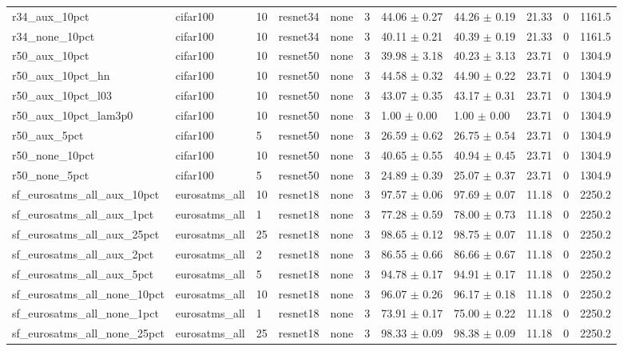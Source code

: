 \begin{tabular}{lllllllllll}
r34_aux_10pct & cifar100 & 10 & resnet34 & none & 3 & 44.06 $\pm$ 0.27 & 44.26 $\pm$ 0.19 & 21.33 & 0 & 1161.5 \\
r34_none_10pct & cifar100 & 10 & resnet34 & none & 3 & 40.11 $\pm$ 0.21 & 40.39 $\pm$ 0.19 & 21.33 & 0 & 1161.5 \\
r50_aux_10pct & cifar100 & 10 & resnet50 & none & 3 & 39.98 $\pm$ 3.18 & 40.23 $\pm$ 3.13 & 23.71 & 0 & 1304.9 \\
r50_aux_10pct_hn & cifar100 & 10 & resnet50 & none & 3 & 44.58 $\pm$ 0.32 & 44.90 $\pm$ 0.22 & 23.71 & 0 & 1304.9 \\
r50_aux_10pct_l03 & cifar100 & 10 & resnet50 & none & 3 & 43.07 $\pm$ 0.35 & 43.17 $\pm$ 0.31 & 23.71 & 0 & 1304.9 \\
r50_aux_10pct_lam3p0 & cifar100 & 10 & resnet50 & none & 3 & 1.00 $\pm$ 0.00 & 1.00 $\pm$ 0.00 & 23.71 & 0 & 1304.9 \\
r50_aux_5pct & cifar100 & 5 & resnet50 & none & 3 & 26.59 $\pm$ 0.62 & 26.75 $\pm$ 0.54 & 23.71 & 0 & 1304.9 \\
r50_none_10pct & cifar100 & 10 & resnet50 & none & 3 & 40.65 $\pm$ 0.55 & 40.94 $\pm$ 0.45 & 23.71 & 0 & 1304.9 \\
r50_none_5pct & cifar100 & 5 & resnet50 & none & 3 & 24.89 $\pm$ 0.39 & 25.07 $\pm$ 0.37 & 23.71 & 0 & 1304.9 \\
sf_eurosatms_all_aux_10pct & eurosatms_all & 10 & resnet18 & none & 3 & 97.57 $\pm$ 0.06 & 97.69 $\pm$ 0.07 & 11.18 & 0 & 2250.2 \\
sf_eurosatms_all_aux_1pct & eurosatms_all & 1 & resnet18 & none & 3 & 77.28 $\pm$ 0.59 & 78.00 $\pm$ 0.73 & 11.18 & 0 & 2250.2 \\
sf_eurosatms_all_aux_25pct & eurosatms_all & 25 & resnet18 & none & 3 & 98.65 $\pm$ 0.12 & 98.75 $\pm$ 0.07 & 11.18 & 0 & 2250.2 \\
sf_eurosatms_all_aux_2pct & eurosatms_all & 2 & resnet18 & none & 3 & 86.55 $\pm$ 0.66 & 86.66 $\pm$ 0.67 & 11.18 & 0 & 2250.2 \\
sf_eurosatms_all_aux_5pct & eurosatms_all & 5 & resnet18 & none & 3 & 94.78 $\pm$ 0.17 & 94.91 $\pm$ 0.17 & 11.18 & 0 & 2250.2 \\
sf_eurosatms_all_none_10pct & eurosatms_all & 10 & resnet18 & none & 3 & 96.07 $\pm$ 0.26 & 96.17 $\pm$ 0.18 & 11.18 & 0 & 2250.2 \\
sf_eurosatms_all_none_1pct & eurosatms_all & 1 & resnet18 & none & 3 & 73.91 $\pm$ 0.17 & 75.00 $\pm$ 0.22 & 11.18 & 0 & 2250.2 \\
sf_eurosatms_all_none_25pct & eurosatms_all & 25 & resnet18 & none & 3 & 98.33 $\pm$ 0.09 & 98.38 $\pm$ 0.09 & 11.18 & 0 & 2250.2 \\

\end{tabular}
